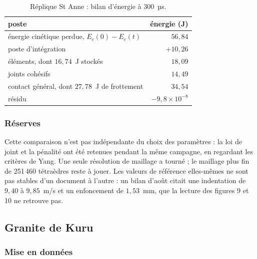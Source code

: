 \begin{table}[htbp]
\centering
\caption{Réplique St Anne : bilan d'énergie à 300~µs.}
\label{tab-stanne-B4}
\small
\begin{tabular}{@{}lr@{}}
\toprule
poste & énergie (J) \\
\midrule
énergie cinétique perdue, $E_c(0) - E_c(t)$ & $56{,}84$ \\
poste d'intégration & $+10{,}26$ \\
éléments, dont $16{,}74$~J stockés & $18{,}09$ \\
joints cohésifs & $14{,}49$ \\
contact général, dont $27{,}78$~J de frottement & $34{,}54$ \\
résidu & $-9{,}8\times10^{-8}$ \\
\bottomrule
\end{tabular}
\end{table}

\subsubsection{Réserves}

Cette comparaison n'est pas indépendante du choix des paramètres : la loi de joint et la pénalité ont été retenues pendant la même campagne, en regardant les critères de Yang. Une seule résolution de maillage a tourné ; le maillage plus fin de 251\,460 tétraèdres reste à jouer. Les valeurs de référence elles-mêmes ne sont pas stables d'un document à l'autre : un bilan d'août citait une indentation de $9{,}40$ à $9{,}85$~m/s et un enfoncement de $1{,}53$~mm, que la lecture des figures 9 et 10 ne retrouve pas.

\subsection{Granite de Kuru}

\subsubsection{Mise en données}

